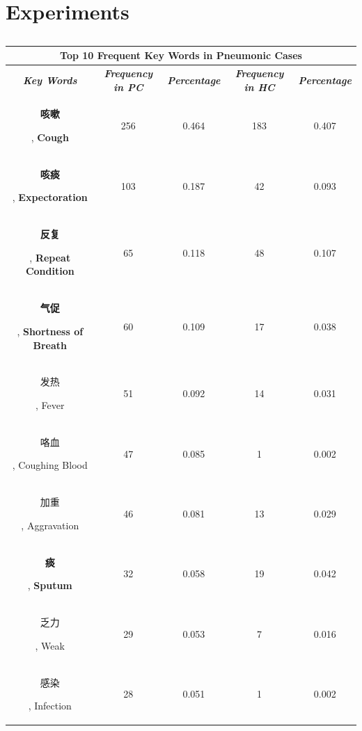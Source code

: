 \section{Experiments}
\label{experiments}
\begin{table}[htb]
    \vspace{-0cm}
\caption{}
\vspace{-0cm}
\begin{center}
\begin{tabular}{c|c|c|c|c}
\multicolumn{5}{c}{\textbf{Top 10 Frequent Key Words in Pneumonic Cases}} \\
\hline
    \textbf{\textit{Key Words}} & \textbf{\textit{Frequency in PC}} & \textbf{\textit{Percentage}}& \textbf{\textit{Frequency in HC}}& \textbf{\textit{Percentage}} \\
\hline
\begin{CJK}{UTF8}{gbsn}\textbf{咳嗽}\end{CJK}, \textbf{Cough} & 256 & 0.464 & 183 & 0.407\\
\begin{CJK}{UTF8}{gbsn}\textbf{咳痰}\end{CJK}, \textbf{Expectoration} & 103 & 0.187 & 42 & 0.093\\
\begin{CJK}{UTF8}{gbsn}\textbf{反复}\end{CJK}, \textbf{Repeat Condition} & 65 & 0.118 & 48 & 0.107\\
\begin{CJK}{UTF8}{gbsn}\textbf{气促}\end{CJK}, \textbf{Shortness of Breath} & 60 & 0.109 & 17 & 0.038\\
\begin{CJK}{UTF8}{gbsn}发热\end{CJK}, Fever & 51 & 0.092 & 14 & 0.031\\
\begin{CJK}{UTF8}{gbsn}咯血\end{CJK}, Coughing Blood & 47 & 0.085 & 1 & 0.002\\
\begin{CJK}{UTF8}{gbsn}加重\end{CJK}, Aggravation & 46 & 0.081 & 13 & 0.029\\
\begin{CJK}{UTF8}{gbsn}\textbf{痰}\end{CJK}, \textbf{Sputum} & 32 & 0.058 & 19 & 0.042\\
\begin{CJK}{UTF8}{gbsn}乏力\end{CJK}, Weak& 29 & 0.053 & 7 & 0.016\\
\begin{CJK}{UTF8}{gbsn}感染\end{CJK}, Infection& 28 & 0.051 & 1 & 0.002\\



\end{tabular}
\end{center}
\end{table}
